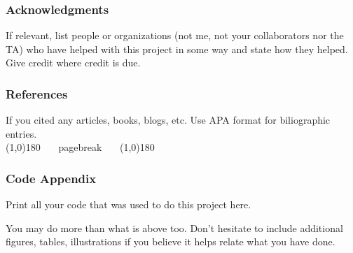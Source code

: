 \documentclass[12pt]{article}
\begin{document}
\begin{tcolorbox}
\subsubsection*{Acknowledgments}

If relevant, list people or organizations (not me, not your collaborators nor the TA) who have helped with this project in some way and state how they helped. Give credit where credit is due.

\subsubsection*{References}

If you cited any articles, books, blogs, etc. Use APA format for biliographic entries.\\

\line(1,0){180} ~~~pagebreak~~~ \line(1,0){180}

\subsubsection*{Code Appendix}

Print all your code that was used to do this project here.

\end{tcolorbox}


\noindent You may do more than what is above too. Don't hesitate to include additional figures, tables, illustrations if you believe it helps relate what you have done.
\end{document}
